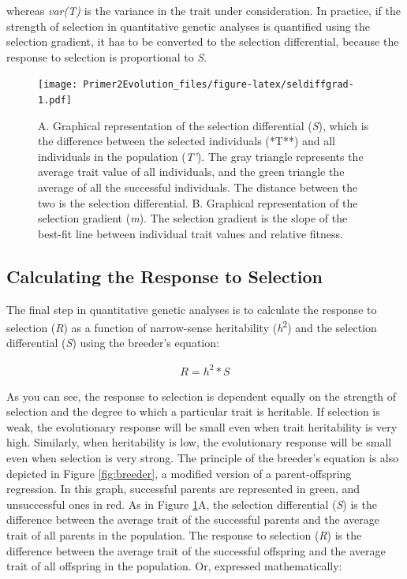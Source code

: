 \documentclass[
]{book}
\begin{document}
whereas \emph{var(T)} is the variance in the trait under consideration. In practice, if the strength of selection in quantitative genetic analyses is quantified using the selection gradient, it has to be converted to the selection differential, because the response to selection is proportional to \emph{S}.

\begin{figure}
\centering
\texttt{[image: Primer2Evolution\_files/figure-latex/seldiffgrad-1.pdf]}
\caption{\label{fig:seldiffgrad}A. Graphical representation of the selection differential (\emph{S}), which is the difference between the selected individuals (*T**) and all individuals in the population (\emph{T'}). The gray triangle represents the average trait value of all individuals, and the green triangle the average of all the successful individuals. The distance between the two is the selection differential. B. Graphical representation of the selection gradient (\emph{m}). The selection gradient is the slope of the best-fit line between individual trait values and relative fitness.}
\end{figure}

\hypertarget{calculating-the-response-to-selection}{%
\subsection{Calculating the Response to Selection}\label{calculating-the-response-to-selection}}

The final step in quantitative genetic analyses is to calculate the response to selection (\emph{R}) as a function of narrow-sense heritability (\emph{h}\textsuperscript{2}) and the selection differential (\emph{S}) using the breeder's equation:

\begin{align} 
R=h^2*S \label{eq:42}
\end{align}

As you can see, the response to selection is dependent equally on the strength of selection and the degree to which a particular trait is heritable. If selection is weak, the evolutionary response will be small even when trait heritability is very high. Similarly, when heritability is low, the evolutionary response will be small even when selection is very strong. The principle of the breeder's equation is also depicted in Figure \ref{fig:breeder}, a modified version of a parent-offspring regression. In this graph, successful parents are represented in green, and unsuccessful ones in red. As in Figure \ref{fig:seldiffgrad}A, the selection differential (\emph{S}) is the difference between the average trait of the successful parents and the average trait of all parents in the population. The response to selection (\emph{R}) is the difference between the average trait of the successful offspring and the average trait of all offspring in the population. Or, expressed mathematically:
\end{document}
